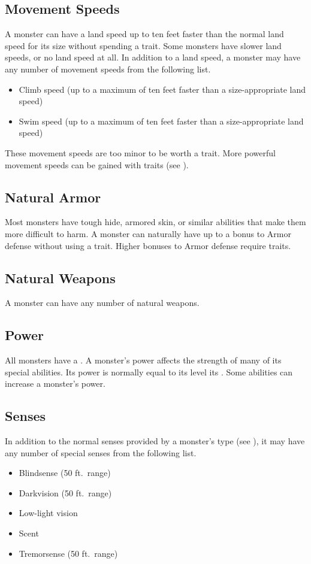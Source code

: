     \subsection{Movement Speeds}
        A monster can have a land speed up to ten feet faster than the normal land speed for its size without spending a trait.
        Some monsters have slower land speeds, or no land speed at all.
        In addition to a land speed, a monster may have any number of movement speeds from the following list.
        \begin{itemize}
            \item Climb speed (up to a maximum of ten feet faster than a size-appropriate land speed)
            \item Swim speed (up to a maximum of ten feet faster than a size-appropriate land speed)
        \end{itemize}

        These movement speeds are too minor to be worth a trait.
        More powerful movement speeds can be gained with traits (see ).

    \subsection{Natural Armor}
        Most monsters have tough hide, armored skin, or similar abilities that make them more difficult to harm.
        A monster can naturally have up to a  bonus to Armor defense without using a trait.
        Higher bonuses to Armor defense require traits.

    \subsection{Natural Weapons}
        A monster can have any number of natural weapons.

    \subsection{Power}\label{Power}
        All monsters have a .
        A monster's power affects the strength of many of its special abilities.
        Its power is normally equal to its level \add its .
        Some abilities can increase a monster's power.

    \subsection{Senses}
        In addition to the normal senses provided by a monster's type (see ), it may have any number of special senses from the following list.
        \begin{itemize}
            \item Blindsense (50 ft.\ range)
            \item Darkvision (50 ft.\ range)
            \item Low-light vision
            \item Scent
            \item Tremorsense (50 ft.\ range)
        \end{itemize}

